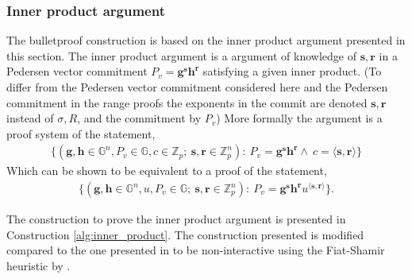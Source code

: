 \subsubsection*{Inner product argument}
\label{sec:inner_prod}
The bulletproof construction is based on the inner product argument presented in this section. The inner product argument is a argument of knowledge of $\textbf{s},\mathbf{r}$ in a  Pedersen vector commitment $P_v=\mathbf{g}^\mathbf{s}\mathbf{h}^\mathbf{r}$ satisfying a given inner product. (To differ from the Pedersen vector commitment considered here and the Pedersen commitment in the range proofs the exponents in the commit are denoted $\mathbf{s},\mathbf{r}$ instead of $\sigma,R$, and the commitment by $P_v$) More formally the argument is a proof system of the statement,
\begin{align*}
    \{(\mathbf{g},\mathbf{h}\in\mathds{G}^n,P_v\in\mathds{G},c\in\mathds{Z}_p;\: \mathbf{s},\mathbf{r}\in\mathds{Z}_p^n) : \: P_v=\mathbf{g}^\mathbf{s}\mathbf{h}^\mathbf{r}\wedge\: c =\langle\mathbf{s},\mathbf{r}\rangle\}
\end{align*}
Which can be shown to be equivalent to a proof of the statement,
\begin{align*}
    \{(\mathbf{g},\mathbf{h}\in\mathds{G}^n,u,P_v\in\mathds{G};\: \mathbf{s},\mathbf{r}\in\mathds{Z}_p^n) : \: P_v=\mathbf{g}^\mathbf{s}\mathbf{h}^\mathbf{r}u^{\langle\mathbf{s},\mathbf{r}\rangle}\}.
\end{align*}

The construction to prove the inner product argument is presented in Construction \ref{alg:inner_product}. The construction presented is modified compared to the one presented in \cite{bulletProofs_theory} to be non-interactive using the Fiat-Shamir heuristic by \cite{ZKRP_Morais}.

